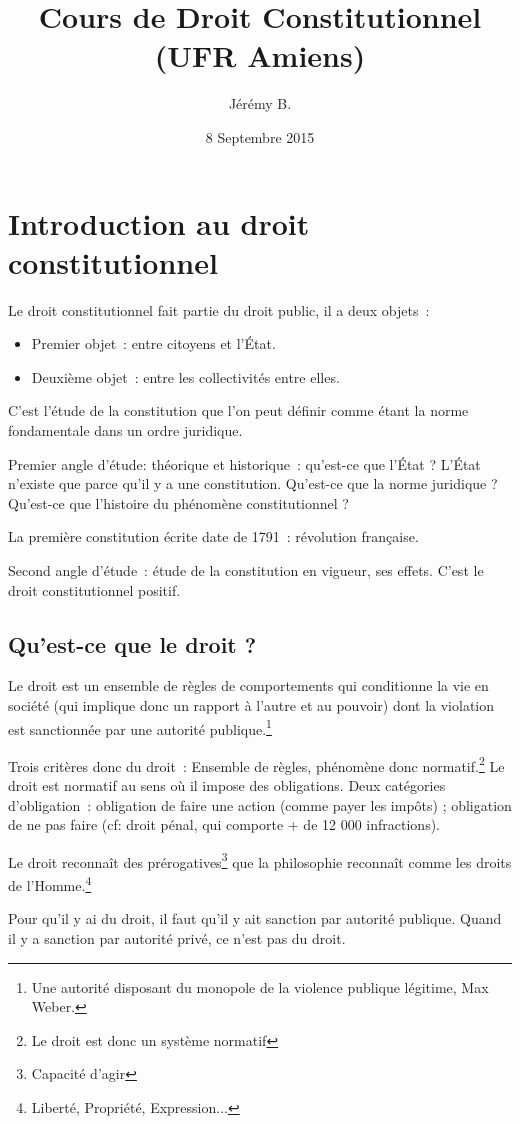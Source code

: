 ﻿\documentclass[12pt, a4paper, openany]{book}
\author{Jérémy B.}
\date{8 Septembre 2015}
\title{Cours de Droit Constitutionnel (UFR Amiens)}
\begin{document}
\chapter{Introduction au droit constitutionnel}

Le droit constitutionnel fait partie du droit public, il a deux objets~:
\begin{itemize}
\item Premier objet~: entre citoyens et l'État.
\item Deuxième objet~: entre les collectivités entre elles.
\end{itemize}
C'est l'étude de la constitution que l'on peut définir comme étant la norme fondamentale dans un ordre juridique.

Premier angle d'étude: théorique et historique~: qu'est-ce que l'État ? L'État n'existe que parce qu’il y a une constitution. Qu'est-ce que la norme juridique ? Qu'est-ce que l'histoire du phénomène constitutionnel ?

La première constitution écrite date de 1791~: révolution française.

Second angle d'étude~: étude de la constitution en vigueur, ses effets. C'est le droit constitutionnel positif.

\section{Qu'est-ce que le droit ?}

Le droit est un ensemble de règles de comportements qui conditionne la vie en société (qui implique donc un rapport à l'autre et au pouvoir) dont la violation est sanctionnée par une autorité publique.\footnote{Une autorité disposant du monopole de la violence publique légitime, Max Weber.}

Trois critères donc du droit~:
Ensemble de règles, phénomène donc normatif.\footnote{Le droit est donc un système normatif} Le droit est normatif au sens où il impose des obligations. Deux catégories d'obligation~: obligation de faire une action (comme payer les impôts) ; obligation de ne pas faire (cf: droit pénal, qui comporte + de 12 000 infractions).

Le droit reconnaît des prérogatives\footnote{Capacité d'agir} que la philosophie reconnaît comme les droits de l'Homme.\footnote{Liberté, Propriété, Expression...}\newline

Pour qu'il y ai du droit, il faut qu'il y ait sanction par autorité publique. Quand il y a sanction par autorité privé, ce n'est pas du droit.
\end{document}
